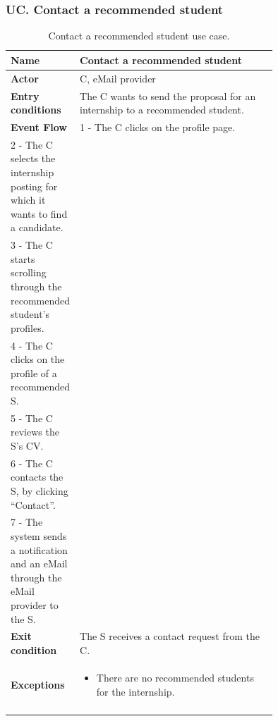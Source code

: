 \subsubsection*{UC\cuc . Contact a recommended student}
\begin{center}
    \begin{longtable}{|l|p{0.75\linewidth}|}
        \hline
        \textbf{Name}               & Contact a recommended student\\
        \hline
        \textbf{Actor}              & C, eMail provider\\
        \hline
        \textbf{Entry conditions}   & The C wants to send the proposal for an internship to a recommended student.\\
        \hline
        \textbf{Event Flow}         & 
        1 - The C clicks on the profile page. \\
        2 - The C selects the internship posting for which it wants to find a candidate. \\
        3 - The C starts scrolling through the recommended student’s profiles. \\
        4 - The C clicks on the profile of a recommended S. \\
        5 - The C reviews the S’s CV. \\
        6 - The C contacts the S, by clicking “Contact”. \\
        7 - The system sends a notification and an eMail through the eMail provider to the S. \\
        \hline
        \textbf{Exit condition}   & The S receives a contact request from the C. \\       
        \hline
        \textbf{Exceptions}       & \begin{itemize}
            \item There are no recommended students for the internship.
        \end{itemize}\\
        \hline
        \caption{Contact a recommended student use case.}
        \label{tab: contact_recommended_student_use_case}
    \end{longtable}
\end{center}


